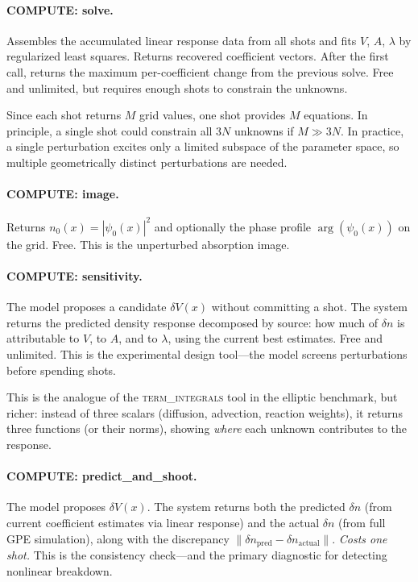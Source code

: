 \documentclass[11pt]{article}
\begin{document}
\paragraph{COMPUTE: solve.}
Assembles the accumulated linear response data from all shots and fits $V$, $A$, $\lambda$ by regularized least squares. Returns recovered coefficient vectors. After the first call, returns the maximum per-coefficient change from the previous solve. Free and unlimited, but requires enough shots to constrain the unknowns.

Since each shot returns $M$ grid values, one shot provides $M$ equations. In principle, a single shot could constrain all $3N$ unknowns if $M \gg 3N$. In practice, a single perturbation excites only a limited subspace of the parameter space, so multiple geometrically distinct perturbations are needed.

\paragraph{COMPUTE: image.}
Returns $n_0(x) = |\psi_0(x)|^2$ and optionally the phase profile $\arg(\psi_0(x))$ on the grid. Free. This is the unperturbed absorption image.

\paragraph{COMPUTE: sensitivity.}
The model proposes a candidate $\delta V(x)$ without committing a shot. The system returns the predicted density response decomposed by source: how much of $\delta n$ is attributable to $V$, to $A$, and to $\lambda$, using the current best estimates. Free and unlimited. This is the experimental design tool---the model screens perturbations before spending shots.

This is the analogue of the \textsc{term\_integrals} tool in the elliptic benchmark, but richer: instead of three scalars (diffusion, advection, reaction weights), it returns three functions (or their norms), showing \emph{where} each unknown contributes to the response.

\paragraph{COMPUTE: predict\_and\_shoot.}
The model proposes $\delta V(x)$. The system returns both the predicted $\delta n$ (from current coefficient estimates via linear response) and the actual $\delta n$ (from full GPE simulation), along with the discrepancy $\|\delta n_{\mathrm{pred}} - \delta n_{\mathrm{actual}}\|$. \emph{Costs one shot.} This is the consistency check---and the primary diagnostic for detecting nonlinear breakdown.
\end{document}
